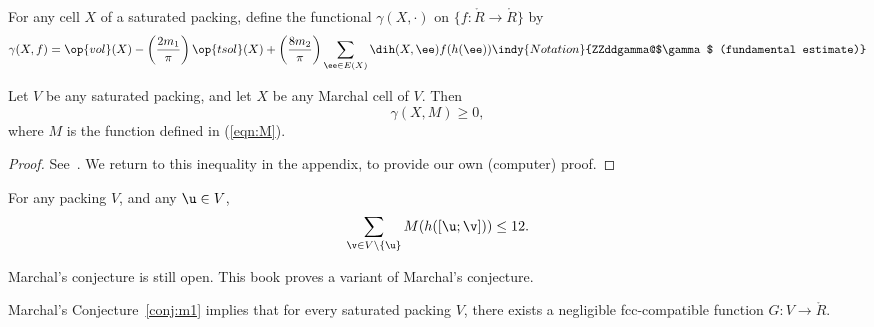 \begin{definition}[$\gamma$] 
For any cell $X$ of a saturated packing, 
define the functional $\gamma(X,\cdot)$ on  $\{f:\ring{R}\to\ring{R}\}$ by
\begin{equation}\label{eqn:gamma-def} 
\gamma(X,f) =  \op{vol}(X)
-\left(\frac{2m_1}{\pi}\right) \op{tsol}(X) + \left(\frac{8m_2}{\pi}\right)
\sum_{\ee\in E(X)} \dih(X,\ee)  f(h(\ee))
\indy{Notation}{ZZddgamma@$\gamma$ (fundamental estimate)}%
\end{equation}
\end{definition}


\begin{theorem}\label{lemma:MI} 
Let $V$ be any saturated packing, and let $X$ be any Marchal cell of $V$.  Then
\begin{equation}\label{eqn:mfe} 
\gamma(X,M)\ge 0,
\end{equation}
where $M$ is the function defined in (\ref{eqn:M}).
\end{theorem}

\begin{proof}  See~\cite{marchal:2009}.  We return to this inequality in the appendix,
to provide our own (computer) proof.
\end{proof}


\begin{conjecture}[Marchal]\label{conj:m1} 
For any packing $ V$, and
any $ \u\in V$,
\begin{displaymath} 
\sum_{\v\in V\setminus\{\u\}} M(h([\u;\v])) \le 12.
\end{displaymath}
\end{conjecture}

Marchal's conjecture is still open.  This book proves a variant of
Marchal's conjecture.

\begin{theorem}\label{theorem:mk1} 
Marchal's Conjecture~\ref{conj:m1} implies
that for every saturated packing $V$, there exists a negligible fcc-compatible function
$G:V\to \ring{R}$.
\end{theorem}



